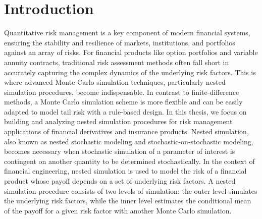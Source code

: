 \chapter{Introduction}

Quantitative risk management is a key component of modern financial systems, ensuring the stability and resilience of markets, institutions, and portfolios against an array of risks. 
For financial products like option portfolios and variable annuity contracts, traditional risk assessment methods often fall short in accurately capturing the complex dynamics of the underlying risk factors.
This is where advanced Monte Carlo simulation techniques, particularly nested simulation procedures, become indispensable.
In contrast to finite-difference methods, a Monte Carlo simulation scheme is more flexible and can be easily adapted to model tail risk with a rule-based design.
In this thesis, we focus on building and analyzing nested simulation procedures for risk management applications of financial derivatives and insurance products.
Nested simulation, also known as nested stochastic modeling and stochastic-on-stochastic modeling, becomes necessary when stochastic simulation of a parameter of interest is contingent on another quantity to be determined stochastically.
In the context of financial engineering, nested simulation is used to model the risk of a financial product whose payoff depends on a set of underlying risk factors.
A nested simulation procedure consists of two levels of simulation: the outer level simulates the underlying risk factors, while the inner level estimates the conditional mean of the payoff for a given risk factor with another Monte Carlo simulation.




